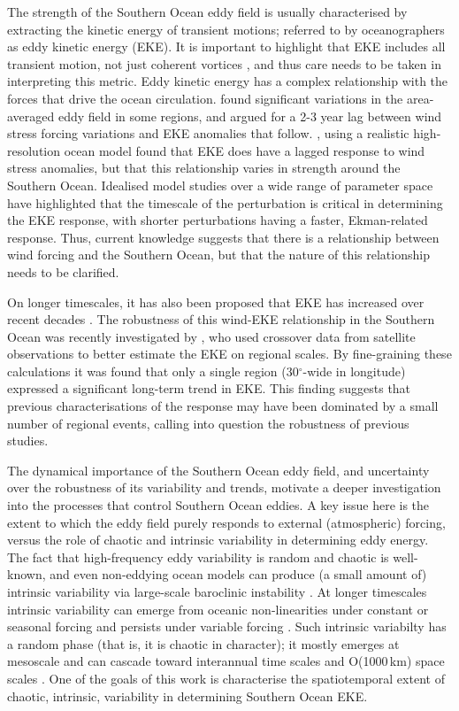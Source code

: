 \documentclass[linenumbers]{agujournal2019}
\begin{document}
The strength of the Southern Ocean eddy field is usually characterised by extracting the kinetic energy of transient motions; referred to by oceanographers as eddy kinetic energy (EKE). 
It is important to highlight that EKE includes all transient motion, not just coherent vortices \citep{Martinez-Moreno2019}, and thus care needs to be taken in interpreting this metric.
Eddy kinetic energy has a complex relationship with the forces that drive the ocean circulation.
\citet{Meredith-Hogg-2006} found significant variations in the area-averaged eddy field in some regions, and argued for a 2-3 year lag between wind stress forcing variations and EKE anomalies that follow.
\citet{Patara2016}, using a realistic high-resolution ocean model found that EKE does have a lagged response to wind stress anomalies, but that this relationship varies in strength around the Southern Ocean.
Idealised model studies over a wide range of parameter space \citep{Sinha2016} have highlighted that the timescale of the perturbation is critical in determining the EKE response, with shorter perturbations having a faster, Ekman-related response.
Thus, current knowledge suggests that there is a relationship between wind forcing and the Southern Ocean, but that the nature of this relationship needs to be clarified.

On longer timescales, it has also been proposed that EKE has increased over recent decades \citep{Hogg2015, Martinez-Moreno2019, Martinez-Moreno2021-ncc}.
The robustness of this wind-EKE relationship in the Southern Ocean was recently investigated by \citet{Zhang2021}, who used crossover data from satellite observations \citep[as in][]{Hogg2015} to better estimate the EKE on regional scales.
By fine-graining these calculations it was found that only a single region (30$^\circ$-wide in longitude) expressed a significant long-term trend in EKE.
This finding  suggests that previous characterisations of the response may have been dominated by a small number of regional events, calling into question the robustness of previous studies.

The dynamical importance of the Southern Ocean eddy field, and uncertainty over the robustness of its variability and trends, motivate a deeper investigation into the processes that control Southern Ocean eddies.
A key issue here is the extent to which the eddy field purely responds to external (atmospheric) forcing, versus the role of chaotic and intrinsic variability in determining eddy energy.
The fact that high-frequency eddy variability is random and chaotic is well-known, and even non-eddying ocean models can produce (a small amount of) intrinsic variability via large-scale baroclinic instability \citep[e.g.][]{DeVerdiere1999,Constantinou2021}.
At longer timescales intrinsic variability can emerge from oceanic non-linearities under constant or seasonal forcing and persists under variable forcing \citep{Leroux2018}.
Such intrinsic variabilty has a random phase (that is, it is chaotic in character); it mostly emerges at mesoscale and can cascade toward interannual time scales and O(1000$\,$km) space scales \citep{Serazin-etal-2018}.
One of the goals of this work is characterise the spatiotemporal extent of chaotic, intrinsic, variability in determining  Southern Ocean EKE.
\end{document}

